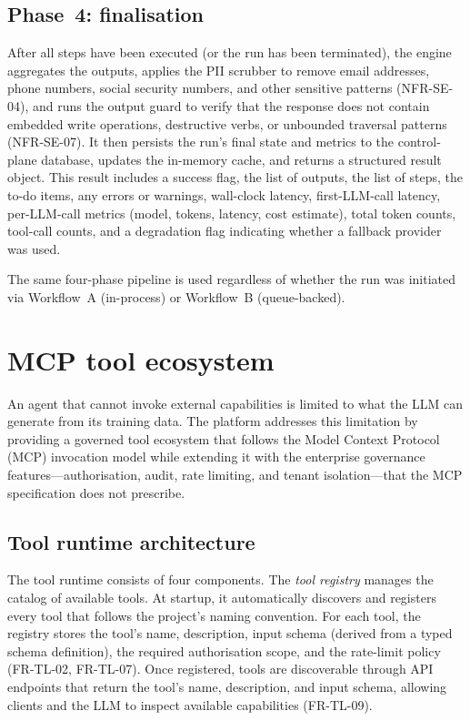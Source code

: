 \documentclass[a4paper]{sapthesis}
\begin{document}
\subsection{Phase~4: finalisation}

After all steps have been executed (or the run has been terminated), the
engine aggregates the outputs, applies the PII scrubber to remove email
addresses, phone numbers, social security numbers, and other sensitive
patterns (NFR-SE-04), and runs the output guard to verify that the
response does not contain embedded write operations, destructive verbs, or
unbounded traversal patterns (NFR-SE-07).  It then persists the run's
final state and metrics to the control-plane database, updates the
in-memory cache, and returns a structured result object.  This result
includes a success flag, the list of outputs, the list of steps, the
to-do items, any errors or warnings, wall-clock latency, first-LLM-call
latency, per-LLM-call metrics (model, tokens, latency, cost estimate),
total token counts, tool-call counts, and a degradation flag indicating
whether a fallback provider was used.

The same four-phase pipeline is used regardless of whether the run was
initiated via Workflow~A (in-process) or Workflow~B (queue-backed).


\section{MCP tool ecosystem}
\label{sec:mcp-tools}

An agent that cannot invoke external capabilities is limited to what the
LLM can generate from its training data.  The platform addresses this
limitation by providing a governed tool ecosystem that follows the Model
Context Protocol (MCP) invocation model while extending it with the
enterprise governance features---authorisation, audit, rate limiting, and
tenant isolation---that the MCP specification does not prescribe.

\subsection{Tool runtime architecture}

The tool runtime consists of four components.  The \emph{tool registry}
manages the catalog of available tools.  At startup, it
automatically discovers and registers every tool that follows the
project's naming convention.  For each tool, the registry stores the tool's name,
description, input schema (derived from a typed schema definition), the
required authorisation scope, and the rate-limit policy (FR-TL-02,
FR-TL-07).  Once registered, tools are discoverable through API endpoints
that return the tool's name, description, and input schema, allowing
clients and the LLM to inspect available capabilities (FR-TL-09).
\end{document}
